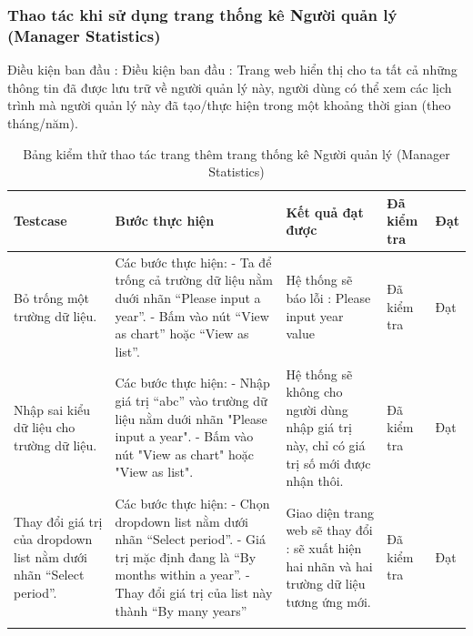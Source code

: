 \documentclass{article}
\begin{document}
\subsubsection{Thao tác khi sử dụng trang thống kê Người quản lý (Manager Statistics) }
Điều kiện ban đầu : Điều kiện ban đầu : Trang web hiển thị cho ta tất cả những thông tin đã được lưu trữ về người quản lý này, người dùng có thể xem các lịch trình mà người quản lý này đã tạo/thực hiện trong một khoảng thời gian (theo tháng/năm).  \newline
\begin{longtable}{ | p{} |p{} | p{}  | p{}  | p{}  | } 
\hline
\textbf{Testcase}& \textbf{Bước thực hiện}& \textbf{Kết quả đạt được} & \textbf{Đã kiểm tra}& \textbf{Đạt} \\ 
\hline
\hline
Bỏ trống một trường dữ liệu. &
Các bước thực hiện: \newline
- Ta để trống cả trường dữ liệu nằm duới nhãn “Please input a year”. \newline
- Bấm vào nút “View as chart” hoặc “View as list”.
&
Hệ thống sẽ báo lỗi : Please input year value
&
Đã kiểm tra &
Đạt \\

\hline
Nhập sai kiểu dữ liệu cho trường dữ liệu. &
Các bước thực hiện: \newline
- Nhập giá trị “abc” vào trường dữ liệu nằm duới nhãn "Please input a year".  \newline
- Bấm vào nút "View as chart" hoặc "View as list".
&
Hệ thống sẽ không cho người dùng nhập giá trị này, chỉ có giá trị số mới được nhận thôi.
&
Đã kiểm tra &
Đạt \\

\hline
Thay đổi giá trị của dropdown list nằm dưới nhãn “Select period”. &
Các bước thực hiện: \newline
- Chọn dropdown list nằm dưới nhãn “Select period”.  \newline
- Giá trị mặc định đang là “By months within a year”. \newline
- Thay đổi giá trị của list này thành “By many years”  
&
Giao diện trang web sẽ thay đổi : sẽ xuất hiện hai nhãn và hai trường dữ liệu tương ứng mới.
&
Đã kiểm tra &
Đạt \\

\hline
\caption{Bảng kiểm thử thao tác trang thêm trang thống kê Người quản lý (Manager Statistics)}
\end{longtable}
\end{document}
